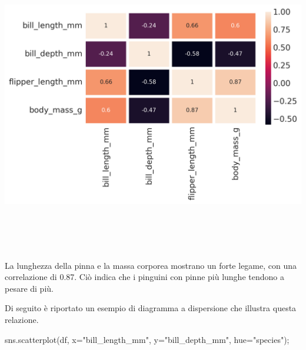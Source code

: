 \documentclass[
  letterpaper,
  krantz2]{{[}./krantz{]}}
\newenvironment{Shaded}{\begin{snugshade}}{\end{snugshade}}
\newcommand{\NormalTok}[1]{\textcolor[rgb]{0.00,0.23,0.31}{#1}}
\newcommand{\OperatorTok}[1]{\textcolor[rgb]{0.37,0.37,0.37}{#1}}
\newcommand{\StringTok}[1]{\textcolor[rgb]{0.13,0.47,0.30}{#1}}
\begin{document}
\includegraphics[width=7.60417in,height=5.11458in]{chapters/python/08_seaborn_files/figure-pdf/cell-10-output-1.png}

La lunghezza della pinna e la massa corporea mostrano un forte legame,
con una correlazione di 0.87. Ciò indica che i pinguini con pinne più
lunghe tendono a pesare di più.

Di seguito è riportato un esempio di diagramma a dispersione che
illustra questa relazione.

\begin{Shaded}
\begin{Highlighting}[]
\NormalTok{sns.scatterplot(df, x}\OperatorTok{=}\StringTok{"bill\_length\_mm"}\NormalTok{, y}\OperatorTok{=}\StringTok{"bill\_depth\_mm"}\NormalTok{, hue}\OperatorTok{=}\StringTok{"species"}\NormalTok{)}\OperatorTok{;}
\end{Highlighting}
\end{Shaded}
\end{document}
